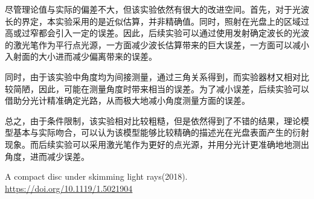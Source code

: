 \documentclass[fontset=windows]{article}
\begin{document}
尽管理论值与实际的偏差不大，但该实验依然有很大的改进空间。首先，对于光波长的界定，本实验采用的是近似估算，并非精确值。同时，照射在光盘上的区域过高或过窄都会引入一定的误差。因此，后续实验可以通过使用发射确定波长的光波的激光笔作为平行点光源，一方面减少波长估算带来的巨大误差，一方面可以减小入射面的大小进而减少偏离带来的误差。

同时，由于该实验中角度均为间接测量，通过三角关系得到，而实验器材又相对比较简陋，因此，可能在测量角度时带来相当的误差。为了减小误差，后续实验可以借助分光计精准确定光路，从而极大地减小角度测量方面的误差。

总之，由于条件限制，该实验相对比较粗糙，但是依然得到了不错的结果，理论模型基本与实际吻合，可以认为该模型能够比较精确的描述光在光盘表面产生的衍射现象。而后续实验可以采用激光笔作为更好的点光源，并用分光计更准确地地测出角度，进而减少误差。

\begin{thebibliography}{30}

     A compact disc under skimming light rays(2018). \url{https://doi.org/10.1119/1.5021904}

\end{thebibliography}
\end{document}
